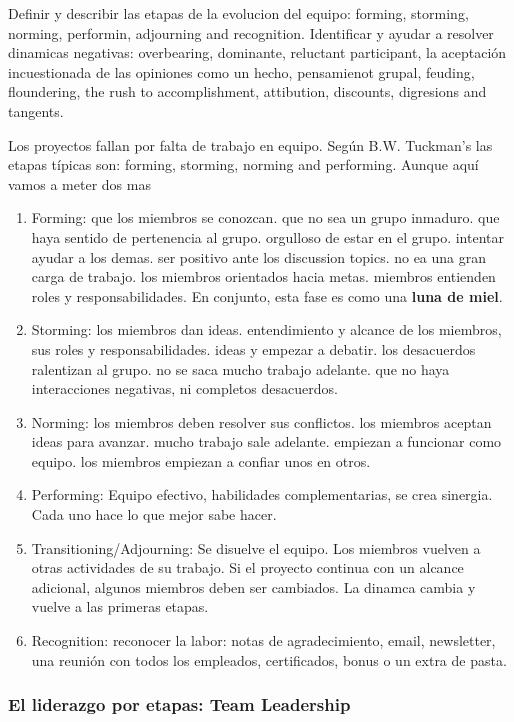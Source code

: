 \documentclass[]{article}
\begin{document}
Definir y describir las etapas de la evolucion del equipo: forming, storming, norming, performin, adjourning and recognition. Identificar y ayudar a resolver dinamicas negativas: overbearing, dominante, reluctant participant, la aceptación incuestionada de las opiniones como un hecho, pensamienot grupal, feuding, floundering, the rush to accomplishment, attibution, discounts, digresions and tangents.

Los proyectos fallan por falta de trabajo en equipo. Según B.W. Tuckman's las etapas típicas son: forming, storming, norming and performing. Aunque aquí vamos a meter dos mas

\begin{enumerate}
	\item Forming: que los miembros se conozcan. que no sea un grupo inmaduro. que haya sentido de pertenencia al grupo. orgulloso de estar en el grupo. intentar ayudar a los demas. ser positivo ante los discussion topics. no ea una gran carga de trabajo. los miembros orientados hacia metas. miembros entienden roles y responsabilidades. En conjunto, esta fase es como una \textbf{luna de miel}.
	\item Storming: los miembros dan ideas. entendimiento y alcance de los miembros, sus roles y responsabilidades. ideas y empezar a debatir. los desacuerdos ralentizan al grupo. no se saca mucho trabajo adelante. que no haya interacciones negativas, ni completos desacuerdos.
	\item Norming: los miembros deben resolver sus conflictos. los miembros aceptan ideas para avanzar. mucho trabajo sale adelante. empiezan a funcionar como equipo. los miembros empiezan a confiar unos en otros. 
	\item Performing: Equipo efectivo, habilidades complementarias, se crea sinergia. Cada uno hace lo que mejor sabe hacer.
	\item Transitioning/Adjourning: Se disuelve el equipo. Los miembros vuelven a otras actividades de su trabajo. Si el proyecto continua con un alcance adicional, algunos miembros deben ser cambiados. La dinamca cambia y vuelve a las primeras etapas. 
	\item Recognition: reconocer la labor: notas de agradecimiento, email, newsletter, una reunión con todos los empleados, certificados, bonus o un extra de pasta.
\end{enumerate}

\subsubsection{El liderazgo por etapas: Team Leadership}
\end{document}
